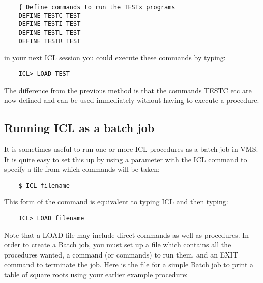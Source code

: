 \begin{small}
\begin{verbatim}
    { Define commands to run the TESTx programs
    DEFINE TESTC TEST
    DEFINE TESTI TEST
    DEFINE TESTL TEST
    DEFINE TESTR TEST
\end{verbatim}
\end{small}

in your next ICL session you could execute these commands by typing:

\begin{small}
\begin{verbatim}
    ICL> LOAD TEST
\end{verbatim}
\end{small}

The difference from the previous method is that the commands TESTC etc are
now defined and can be used immediately without having to execute a procedure.

\subsection{Running ICL as a batch job}
\label{S_iclbatch}

It is sometimes useful to run one or more ICL procedures as a batch job in VMS.
It is quite easy to set this up by using a parameter with the ICL command to
specify a file from which commands will be taken:

\begin{small}
\begin{verbatim}
    $ ICL filename
\end{verbatim}
\end{small}

This form of the command is equivalent to typing ICL and then typing:

\begin{small}
\begin{verbatim}
    ICL> LOAD filename
\end{verbatim}
\end{small}

Note that a LOAD file may include direct commands as well as procedures.
In order to create a Batch job, you must set up a file which contains all the
procedures wanted, a command (or commands) to run them, and an EXIT command to
terminate the job.
Here is the file for a simple Batch job to print a table of square roots using
your earlier example procedure:

